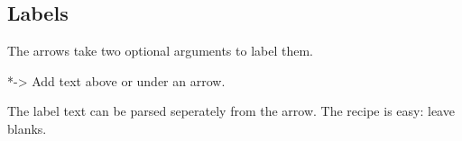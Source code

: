 \documentclass[load-preamble+]{cnltx-doc}
\makeatletter
\newcommand*\cf@arrow{%
  \@ifstar
    {\cf@arrow@star}
    {\cf@arrow@nostar}%
}
\newenvironment{arrows}
  {%
    \let\arrow\cf@arrow
    \cnltxlist
  }
  {\endcnltxlist}
\makeatother
\begin{document}
\subsection{Labels}
The arrows take two optional arguments to label them.
\begin{arrows}
  \arrow*{->}
    Add text above or under an arrow.
\end{arrows}
\begin{example}
   \par
   \par
\end{example}
The label text can be parsed seperately from the arrow. The recipe is easy:
leave blanks.
\begin{example}
   \par
   \par
   \par
\end{example}
\end{document}
